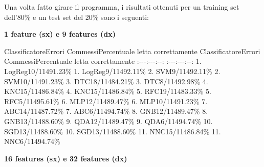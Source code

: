 \documentclass[11pt]{article}
\begin{document}
    Una volta fatto girare il programma, i risultati ottenuti per un
training set dell'80\% e un test set del 20\% sono i seguenti:

\textbf{1 feature (sx) e 9 features (dx)}

\textbar{}Classificatore\textbar{}Errori Commessi\textbar{}Percentuale
letta correttamente\textbar{} \textbar{}Classificatore\textbar{}Errori
Commessi\textbar{}Percentuale letta correttamente\textbar{}
\textbar{}:-\/-\/-\textbar{}:-\/-\/-:\textbar{}-\/-:\textbar{}
\textbar{}:-\/-\/-\textbar{}:-\/-\/-:\textbar{}-\/-:\textbar{}
\textbar{}1. LogReg\textbar{}10/114\textbar{}91.23\%\textbar{}
\textbar{}1. LogReg\textbar{}9/114\textbar{}92.11\%\textbar{}
\textbar{}2. SVM\textbar{}9/114\textbar{}92.11\%\textbar{} \textbar{}2.
SVM\textbar{}10/114\textbar{}91.23\%\textbar{} \textbar{}3.
DTC\textbar{}18/114\textbar{}84.21\%\textbar{} \textbar{}3.
DTC\textbar{}8/114\textbar{}92.98\%\textbar{} \textbar{}4.
KNC\textbar{}15/114\textbar{}86.84\%\textbar{} \textbar{}4.
KNC\textbar{}15/114\textbar{}86.84\%\textbar{} \textbar{}5.
RFC\textbar{}19/114\textbar{}83.33\%\textbar{} \textbar{}5.
RFC\textbar{}5/114\textbar{}95.61\%\textbar{} \textbar{}6.
MLP\textbar{}12/114\textbar{}89.47\%\textbar{} \textbar{}6.
MLP\textbar{}10/114\textbar{}91.23\%\textbar{} \textbar{}7.
ABC\textbar{}14/114\textbar{}87.72\%\textbar{} \textbar{}7.
ABC\textbar{}6/114\textbar{}94.74\%\textbar{} \textbar{}8.
GNB\textbar{}12/114\textbar{}89.47\%\textbar{} \textbar{}8.
GNB\textbar{}13/114\textbar{}88.60\%\textbar{} \textbar{}9.
QDA\textbar{}12/114\textbar{}89.47\%\textbar{} \textbar{}9.
QDA\textbar{}6/114\textbar{}94.74\%\textbar{} \textbar{}10.
SGD\textbar{}13/114\textbar{}88.60\%\textbar{} \textbar{}10.
SGD\textbar{}13/114\textbar{}88.60\%\textbar{} \textbar{}11.
NNC\textbar{}15/114\textbar{}86.84\%\textbar{} \textbar{}11.
NNC\textbar{}6/114\textbar{}94.74\%\textbar{}

\textbf{16 features (sx) e 32 features (dx)}
\end{document}

